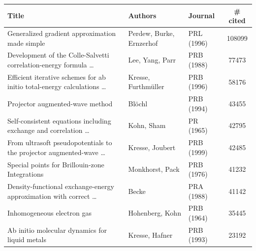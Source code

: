 \documentclass[9pt,review]{livecoms}
\newcommand{\red}[1]{{\color[HTML]{FE0000} #1}}
\begin{document}


\begin{table}
    \centering

\begin{tabular}{lllS[table-format=5.0]}
    \toprule
    Title                                                                 & Authors                    & Journal    & {\# cited} \\ \midrule
{Generalized gradient approximation made simple} & Perdew, Burke, Ernzerhof   & PRL (1996) & 108099  \\
{Development of the Colle-Salvetti correlation-energy formula … }       & Lee, Yang, Parr            & PRB (1988) & 77473   \\
{Efficient iterative schemes for ab initio total-energy calculations …} & Kresse, Furthmüller        & PRB (1996) & 58176   \\
{Projector augmented-wave method                                      } & Blöchl                     & PRB (1994) & 43455   \\
{Self-consistent equations including exchange and correlation …       } & Kohn, Sham                 & PR (1965)  & 42795   \\
{From ultrasoft pseudopotentials to the projector augmented-wave …    } & Kresse, Joubert            & PRB (1999) & 42485   \\
{Special points for Brillouin-zone Integrations                       } & Monkhorst, Pack            & PRB (1976) & 41232   \\
{Density-functional exchange-energy approximation with correct …      } & Becke                      & PRA (1988) & 41142   \\
{Inhomogeneous electron gas                                           } & Hohenberg, Kohn            & PRB (1964) & 35445   \\
{Ab initio molecular dynamics for liquid metals                       } & Kresse, Hafner             & PRB (1993) & 23192   \\

\end{tabular}
\end{table}
\end{document}
